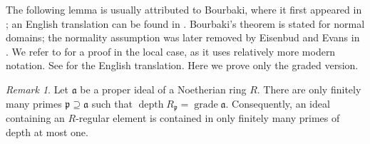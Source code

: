 \documentclass[11pt,letterpaper]{amsart}
\DeclareMathOperator{\dep}{depth}
\theoremstyle{plain}
\theoremstyle{definition}
\theoremstyle{remark}
\newtheorem{remark}[thm]{Remark}
\begin{document}
The following lemma is usually attributed to Bourbaki, where it first appeared in \cite{Bourbaki1961Algebre}; an English translation can be found in \cite[Chapter~7, Section~4.9, Theorem~6]{bourbaki1972commutative}. Bourbaki’s theorem is stated for normal domains; the normality assumption was later removed by Eisenbud and Evans in \cite[Theorem~A]{eisenbud1973generating}. We refer to \cite{bruns1976jede} for a proof in the local case, as it uses relatively more modern notation. See \cite{sanyal2010translation} for the English translation.  Here we prove only the graded version.

\begin{remark}\cite[Hilfssatz]{bruns1976jede}\cite[Lemma]{sanyal2010translation}\label{rem:bruns-finiteness}
Let $\mathfrak a$ be a proper ideal of a Noetherian ring $R$.
There are only finitely many primes $\mathfrak p\supseteq\mathfrak a$
such that $\dep R_{\mathfrak p}=\operatorname{grade}\mathfrak a$.
Consequently, an ideal containing an $R$-regular element is contained
in only finitely many primes of depth at most one.
\end{remark}
\end{document}
